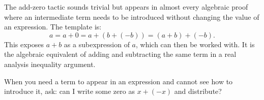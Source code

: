 \begin{remark}
The add-zero tactic sounds trivial but appears in almost every algebraic
proof where an intermediate term needs to be introduced without
changing the value of an expression. The template is:
\[
a = a + 0 = a + (b + (-b)) = (a + b) + (-b).
\]
This exposes $a + b$ as a subexpression of $a$, which can then be
worked with. It is the algebraic equivalent of adding and subtracting
the same term in a real analysis inequality argument.

When you need a term to appear in an expression and cannot see how to
introduce it, ask: can I write some zero as $x + (-x)$ and distribute?
\end{remark}

